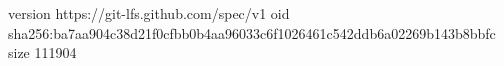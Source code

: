version https://git-lfs.github.com/spec/v1
oid sha256:ba7aa904c38d21f0cfbb0b4aa96033c6f1026461c542ddb6a02269b143b8bbfc
size 111904
